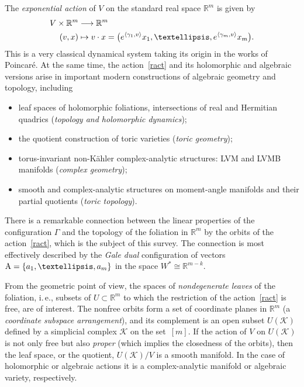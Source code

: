 \documentclass[a4paper]{amsart}
\theoremstyle{definition}
\theoremstyle{remark}
\numberwithin{equation}{section}
\def\R{\mathbb R}
\def\R{\mathbb R}
\newcommand{\mb}[1]{{\textbf {\textit#1}}}
\newcommand{\<}{\langle}
\renewcommand{\>}{\rangle}
\begin{document}
The \emph{exponential action} of $V$ on the standard real space $\R^m$ is given by
\begin{equation}\label{ract}
\begin{aligned}
  V\times\R^m&\longrightarrow\R^m\\
  (\mb v,\mb x)&\mapsto \mb v\cdot\mb x=\bigl(e^{\langle\gamma_1,\mb
  v\rangle}x_1,\ldots,e^{\langle\gamma_m,\mb v\rangle}x_m\bigr).
\end{aligned}
\end{equation}
This is a very classical dynamical system taking its origin in the works of Poincar\'e. 
At the same time, the action~\eqref{ract} and its holomorphic and algebraic versions arise in important modern constructions of algebraic geometry and topology, including

\begin{itemize}
\item[--] leaf spaces of holomorphic foliations, intersections of real and Hermitian quadrics (\emph{topology and holomorphic dynamics});

\item[--] the quotient construction of toric varieties (\emph{toric geometry});

\item[--] torus-invariant non-K\"ahler complex-analytic structures: LVM and LVMB manifolds (\emph{complex geometry});

\item[--] smooth and complex-analytic structures on moment-angle manifolds and their partial quotients (\emph{toric topology}).
\end{itemize}

There is a remarkable connection between the linear properties of the configuration $\Gamma$ and the topology of the foliation in $\mathbb R^m$ by the orbits of the action~\eqref{ract}, which is the subject of this survey. The connection is most effectively described by the \emph{Gale dual} configuration of vectors $\mathrm A=\{\mb a_1,\ldots,\mb a_m\}$ in the space $W^*\cong\mathbb R^{m-k}$.

From the geometric point of view, the spaces of \emph{nondegenerate leaves} of the foliation, i.\,e., subsets of $U\subset\mathbb R^m$ to which the restriction of the action~\eqref{ract} is free, are of interest. The nonfree orbits form a set of coordinate planes in $\R^m$ (a \emph{coordinate subspace arrangement}), and its complement is an open subset $U(\mathcal K)$ defined by a simplicial complex 
$\mathcal K$ on the set~$[m]$. If the action of $V$ on $U(\mathcal K)$ is not only free but also \emph{proper} (which implies the closedness of the orbits), then the leaf space, or the quotient, $U(\mathcal K)/V$ is a smooth manifold. In the case of  holomorphic or algebraic actions it is a complex-analytic manifold or algebraic variety, respectively.
\end{document}
